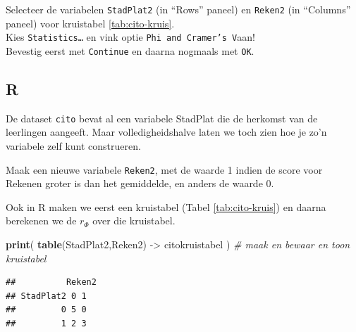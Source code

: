 \documentclass[
]{book}
\newenvironment{Shaded}{\begin{snugshade}}{\end{snugshade}}
\newcommand{\CommentTok}[1]{\textcolor[rgb]{0.56,0.35,0.01}{\textit{#1}}}
\newcommand{\DecValTok}[1]{\textcolor[rgb]{0.00,0.00,0.81}{#1}}
\newcommand{\KeywordTok}[1]{\textcolor[rgb]{0.13,0.29,0.53}{\textbf{#1}}}
\newcommand{\NormalTok}[1]{#1}
\newcommand{\OperatorTok}[1]{\textcolor[rgb]{0.81,0.36,0.00}{\textbf{#1}}}
\newcommand{\StringTok}[1]{\textcolor[rgb]{0.31,0.60,0.02}{#1}}
\begin{document}
Selecteer de variabelen \texttt{StadPlat2} (in ``Rows'' paneel) en \texttt{Reken2}
(in ``Columns'' paneel) voor
kruistabel \ref{tab:cito-kruis}.\\
Kies \texttt{Statistics\ldots{}} en vink optie \texttt{Phi\ and\ Cramer’s\ V}aan!\\
Bevestig eerst met \texttt{Continue} en daarna nogmaals met \texttt{OK}.

\hypertarget{r-9}{%
\subsection{R}\label{r-9}}

De dataset \texttt{cito} bevat al een variabele StadPlat die de herkomst van de leerlingen aangeeft. Maar volledigheidshalve laten we toch zien hoe je zo'n variabele zelf kunt construeren.

\begin{Shaded}
\end{Shaded}

Maak een nieuwe variabele \texttt{Reken2}, met de waarde 1 indien de score
voor Rekenen groter is dan het gemiddelde, en anders de waarde 0.

Ook in R maken we eerst een kruistabel (Tabel \ref{tab:cito-kruis}) en daarna berekenen we de \(r_\Phi\) over die kruistabel.

\begin{Shaded}
\begin{Highlighting}[]
\KeywordTok{print}\NormalTok{( }\KeywordTok{table}\NormalTok{(StadPlat2,Reken2) {-}\textgreater{}}\StringTok{ }\NormalTok{citokruistabel ) }\CommentTok{\# maak en bewaar en toon kruistabel}
\end{Highlighting}
\end{Shaded}

\begin{verbatim}
##          Reken2
## StadPlat2 0 1
##         0 5 0
##         1 2 3
\end{verbatim}
\end{document}
